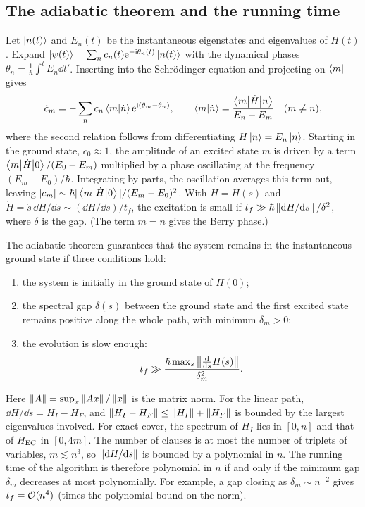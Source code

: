 \subsection{The adiabatic theorem and the running time}
\begin{origin}
Let $\left|n(t)\right\rangle$ and $E_n(t)$ be the instantaneous eigenstates and eigenvalues of $H(t)$. Expand $\left|\psi(t)\right\rangle=\sum_nc_n(t)\mathrm e^{-\mathrm i\theta_n(t)}\left|n(t)\right\rangle$ with the dynamical phases $\theta_n=\frac1\hbar\int^tE_n\dd t'$. Inserting
into the Schrödinger equation and projecting on $\left\langle m\right|$ gives
\begin{equation}
  \dot c_m=-\sum_nc_n\left\langle m\middle|\dot n\right\rangle\mathrm e^{\mathrm i(\theta_m-\theta_n)},\qquad\left\langle m\middle|\dot n\right\rangle=\frac{\left\langle m\middle|\dot H\middle|n\right\rangle}{E_n-E_m}\quad(m\neq n),
\end{equation}
where the second relation follows from differentiating $H\left|n\right\rangle=E_n\left|n\right\rangle$. Starting in the ground state, $c_0\approx1$, the amplitude of an excited state $m$ is driven by a term $\left\langle m\middle|\dot H\middle|0\right\rangle/(E_0-E_m)$ multiplied by a phase
oscillating at the frequency $(E_m-E_0)/\hbar$. Integrating by parts, the oscillation averages this term out, leaving $|c_m|\sim\hbar|\left\langle m\middle|\dot H\middle|0\right\rangle|/(E_m-E_0)^2$. With $H=H(s)$ and $\dot H=\dot s\,\dd H/\dd s\sim(\dd H/\dd s)/t_f$,
the excitation is small if $t_f\gg\hbar\left\|\mathrm d H/\mathrm d s\right\|/\delta^2$, where $\delta$ is the gap. (The term $m=n$ gives the Berry phase.)
\end{origin}
The adiabatic theorem guarantees that the system remains in the instantaneous ground state if three conditions hold:
\begin{enumerate}
  \item the system is initially in the ground state of $H(0)$;
  \item the spectral gap $\delta(s)$ between the ground state and the first excited state remains positive along the whole path, with minimum $\delta_m>0$;
  \item the evolution is slow enough:
  \begin{equation}\label{eq:adiabatic}
    t_f\gg\frac{\hbar\max_s\left\|\frac{\mathrm d}{\mathrm d s}H(s)\right\|}{\delta_m^2}.
  \end{equation}
\end{enumerate}
Here $\left\|A\right\|=\sup_x\left\|Ax\right\|/\left\|x\right\|$ is the matrix norm. For the linear path, $\dd H/\dd s=H_I-H_F$, and $\left\|H_I-H_F\right\|\le\left\|H_I\right\|+\left\|H_F\right\|$ is bounded by the largest eigenvalues involved. For exact cover, the spectrum of $H_I$ lies in
$[0,n]$ and that of $H_{\rm EC}$ in $[0,4m]$. The number of clauses is at most the number of triplets of variables, $m\lesssim n^3$, so $\left\|\mathrm d H/\mathrm d s\right\|$ is bounded by a polynomial in $n$. The running time of the algorithm is therefore
polynomial in $n$ if and only if the minimum gap $\delta_m$ decreases at most polynomially. For example, a gap closing as $\delta_m\sim n^{-2}$ gives $t_f=\mathcal O(n^4)$ (times the polynomial bound on the norm).

